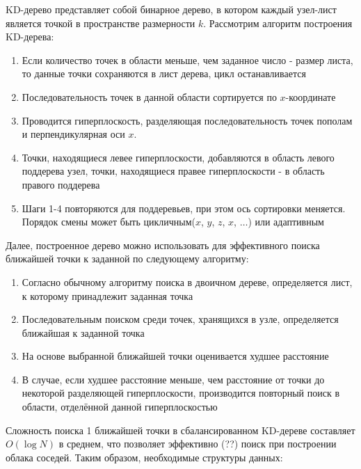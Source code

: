 KD-дерево представляет собой бинарное дерево, в котором каждый узел-лист
является точкой в пространстве размерности $k$. Рассмотрим алгоритм построения
KD-дерева:

\begin{enumerate}
    \item Если количество точек в области меньше, чем заданное число - размер
    листа, то данные точки сохраняются в лист дерева, цикл останавливается
    \item Последовательность точек в данной области сортируется по
    $x$-координате
    \item Проводится гиперплоскость, разделяющая последовательность точек
    пополам и перпендикулярная оси $x$.
    \item Точки, находящиеся левее гиперплоскости, добавляются в область левого
    поддерева узел, точки, находящиеся правее гиперплоскости - в область правого
    поддерева
    \item Шаги 1-4 повторяются для поддеревьев, при этом ось сортировки
    меняется. Порядок смены может быть цикличным($x$, $y$, $z$, $x$, $\dots$)
    или адаптивным
\end{enumerate}

Далее, построенное дерево можно использовать для эффективного поиска ближайшей
точки к заданной по следующему алгоритму:

\begin{enumerate}
    \item Согласно обычному алгоритму поиска в двоичном дереве, определяется
    лист, к которому принадлежит заданная точка
    \item Последовательным поиском среди точек, хранящихся в узле, определяется
    ближайшая к заданной точка
    \item На основе выбранной ближайшей точки оценивается худшее расстояние
    \item В случае, если худшее расстояние меньше, чем расстояние от точки до
    некоторой разделяющей гиперплоскости, производится повторный поиск в
    области, отделённой данной гиперплоскостью
\end{enumerate}

Сложность поиска 1 ближайшей точки в сбалансированном KD-дереве составляет
$O\left(\log N\right)$ в среднем\cite[25]{PointCloudAnalysis}, что позволяет
эффективно (??) поиск при построении облака соседей. Таким образом, необходимые
структуры данных:


